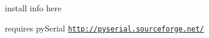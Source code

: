install info here\par
 requires py\-Serial \href{http://pyserial.sourceforge.net/}{\tt http\-://pyserial.\-sourceforge.\-net/} 